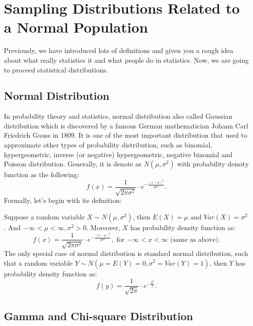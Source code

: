 \chapter{Sampling Distributions Related to a Normal Population}
\label{sec.matrix}
\pagestyle{myheadings}  

Previously, we have introduced lots of definitions and given you a rough idea about what really statistics it and what people do in statistics. Now, we are going to proceed statistical distributions. 

\section{Normal Distribution}

In probability theory and statistics, normal distribution also called Gaussian distribution which is discovered by a famous German mathematician Johann Carl Friedrich Gauss in 1809. It is one of the most important distribution that used to approximate other types of probability distribution, such as binomial, hypergeometric, inverse (or negative) hypergeometric, negative binomial and Poisson distribution. Generally, it is denote as $N(\mu, \sigma^2)$ with probability density function as the following: \[ f(x) = \frac{1}{\sqrt{2 \pi \sigma^2}} \cdot e^{-\frac{(x - \mu)^2}{2\sigma^2}}.\]
Formally, let's begin with its definition:

\begin{definition}
Suppose a random variable $X \sim N(\mu, \sigma^2)$, then $E(X) = \mu \text{ and } Var(X) = \sigma^2$. And $-\infty < \mu < \infty, \sigma^2 > 0.$ Moreover, $X$ has probability density function as: \[ f(x) = \frac{1}{\sqrt{2 \pi \sigma^2}} \cdot e^{-\frac{(x - \mu)^2}{2\sigma^2}}, \text{ for $-\infty < x < \infty$ (same as above).}\]
The only special case of normal distribution is standard normal distribution, such that a random variable $Y \sim N( \mu = E(Y) = 0, \sigma^2 = Var(Y) = 1)$, then $Y$ has probability density function as: \[ f(y) = \frac{1}{\sqrt{2\pi}} \cdot e^{-\frac{y^2}{2}}.\]
\end{definition}

\section{Gamma and Chi-square Distribution}

